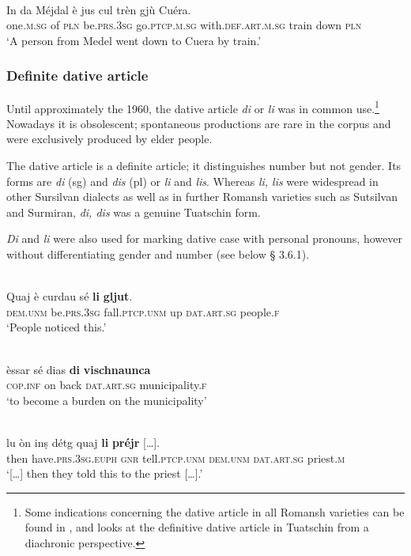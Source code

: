 \ea
{}\\
\gll   In da Méjdal è jus cul trèn gjù Cuéra.\\
     one.\textsc{m.sg} of \textsc{pln} be.\textsc{prs.3sg} go.\textsc{ptcp.m.sg} with.\textsc{def.art.m.sg} train down \textsc{pln}\\
\glt `A person from Medel went down to Cuera by train.'
\z

\subsubsection{Definite dative article} 
Until approximately the 1960, the dative article \textit{di} or \textit{li} was in common use.\footnote{Some indications concerning the dative article in all Romansh varieties can be found in \citet{Linder1987}, and \citet{Maurer2017} looks at the definitive dative article in Tuatschin from a diachronic perspective.} Nowadays it is obsolescent; spontaneous productions are rare in the corpus and were exclusively produced by elder people.

The dative article is a definite article; it distinguishes number but not gender. Its forms are \textit{di} (sg) and \textit{dis} (pl) or \textit{li} and \textit{lis}.  Whereas \textit{li, lis} were widespread in other Sursilvan dialects as well as in further  Romansh varieties such as Sutsilvan and Surmiran, \textit{di, dis} was a genuine Tuatschin form.

\textit{Di} and \textit{li} were also used for marking dative case with personal pronouns, however without differentiating gender and number (see below § 3.6.1).

\ea
{} {\citealt[12]{Büchli1966}}\\
\gll  Quaj è curdau sé \textbf{li} \textbf{gljut}.\\
     \textsc{dem.unm} be.\textsc{prs.3sg} fall.\textsc{ptcp.unm} up \textsc{dat.art.sg} people.\textsc{f}\\
\glt `People noticed this.'
\z

\ea\label{ex:1:}
\\
\gll  èssar sé dias \textbf{di} \textbf{vischnaunca}\\
\textsc{cop.inf} on back \textsc{dat.art.sg} municipality.\textsc{f}\\
\glt `to become a burden on the municipality'
\z

\ea
{}\\
\gll […] lu òn inṣ détg quaj \textbf{li} \textbf{préjr} […].\\
{} then have.\textsc{prs.3sg.euph} \textsc{gnr} tell.\textsc{ptcp.unm} \textsc{dem.unm} \textsc{dat.art.sg} priest.\textsc{m}\\
\glt `[…] then they told this to the priest […].'
\z

